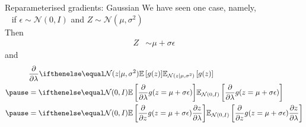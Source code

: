 \documentclass[14pt,dvipsnames]{beamer}
\begin{document}
\begin{frame}{Reparameterised gradients: Gaussian}
	We have  seen one case, namely,\\
	~ if $\epsilon \sim \mathcal N(0, I)$ and $Z \sim \mathcal N(\mu,\sigma^2)$\pause\\
	Then
	\begin{equation*}
	\begin{aligned}
		Z &\sim \mu +  \sigma  \epsilon
	\end{aligned}
	\end{equation*}
	and
	\begin{equation*}
	\begin{aligned}
		&\pdv{\lambda} \E[\mathcal N(z|\mu, \sigma^2)]{ g(z) }\\ \pause
		&= \E[\mathcal N(0, I)]{\pdv{\lambda} g(z = \mu + \sigma  \epsilon)} \\ \pause
		&= \E[\mathcal N(0, I)]{\pdv{z} g(z = \mu + \sigma  \epsilon) \pdv{z}{\lambda}}
	\end{aligned}
	\end{equation*}
\end{frame}

\end{document}

